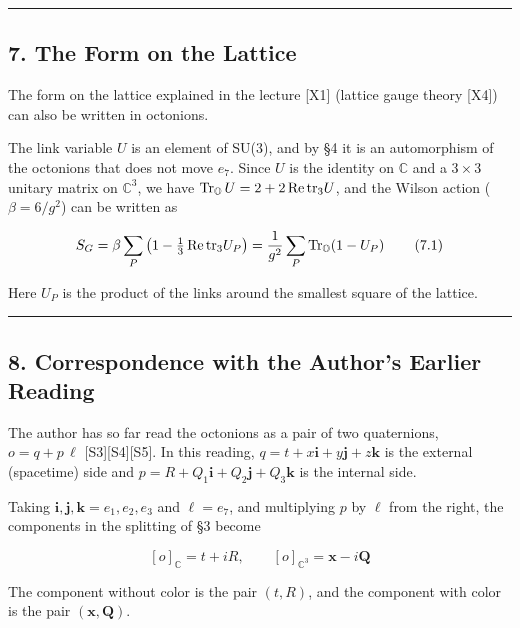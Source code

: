 \documentclass[
  a4paper,
]{article}
\begin{document}
\begin{center}\rule{0.5\linewidth}{0.5pt}\end{center}

\subsection{7. The Form on the Lattice}\label{the-form-on-the-lattice}

The form on the lattice explained in the lecture {[}X1{]} (lattice gauge
theory {[}X4{]}) can also be written in octonions.

The link variable \(U\) is an element of SU(3), and by §4 it is an
automorphism of the octonions that does not move \(e_7\). Since \(U\) is
the identity on \(\mathbb{C}\) and a \(3\times3\) unitary matrix on
\(\mathbb{C}^3\), we have
\({\rm Tr}_{\mathbb O}\,U = 2 + 2\,{\rm Re}\,{\rm tr}_3 U\), and the
Wilson action (\(\beta = 6/g^2\)) can be written as

\[
S_G = \beta\sum_P\left(1 - \tfrac13\,{\rm Re}\,{\rm tr}_3 U_P\right) = \frac{1}{g^2}\sum_P {\rm Tr}_{\mathbb O}\!\left(1 - U_P\right) \tag{7.1}
\]

Here \(U_P\) is the product of the links around the smallest square of
the lattice.

\begin{center}\rule{0.5\linewidth}{0.5pt}\end{center}

\subsection{8. Correspondence with the Author's Earlier
Reading}\label{correspondence-with-the-authors-earlier-reading}

The author has so far read the octonions as a pair of two quaternions,
\(o = q + p\,\ell\) {[}S3{]}{[}S4{]}{[}S5{]}. In this reading,
\(q = t + x\mathbf{i} + y\mathbf{j} + z\mathbf{k}\) is the external
(spacetime) side and
\(p = R + Q_1\mathbf{i} + Q_2\mathbf{j} + Q_3\mathbf{k}\) is the
internal side.

Taking \(\mathbf{i},\mathbf{j},\mathbf{k} = e_1,e_2,e_3\) and
\(\ell = e_7\), and multiplying \(p\) by \(\ell\) from the right, the
components in the splitting of §3 become

\[
[o]_{\mathbb C} = t + iR,\qquad [o]_{\mathbb C^3} = \mathbf{x} - i\mathbf{Q} \tag{8.1}
\]

The component without color is the pair \((t, R)\), and the component
with color is the pair \((\mathbf{x}, \mathbf{Q})\).
\end{document}
